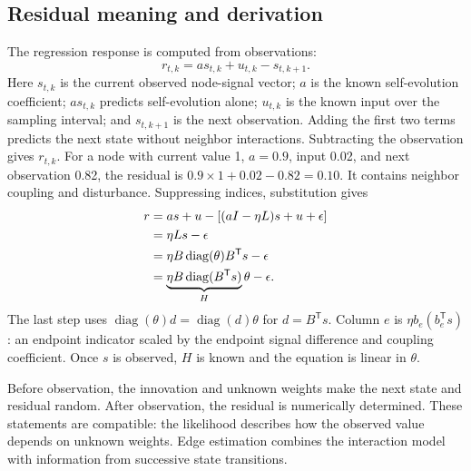 \documentclass[journal]{IEEEtran}
\newcommand{\T}{\mathsf T}
\begin{document}
\subsection{Residual meaning and derivation}
The regression response is computed from observations:
\begin{equation}
r_{t,k}=as_{t,k}+u_{t,k}-s_{t,k+1}.\label{eq:r}
\end{equation}
Here $s_{t,k}$ is the current observed node-signal vector; $a$ is the known self-evolution coefficient; $as_{t,k}$ predicts self-evolution alone; $u_{t,k}$ is the known input over the sampling interval; and $s_{t,k+1}$ is the next observation. Adding the first two terms predicts the next state without neighbor interactions. Subtracting the observation gives $r_{t,k}$. For a node with current value 1, $a=0.9$, input 0.02, and next observation 0.82, the residual is $0.9\times1+0.02-0.82=0.10$. It contains neighbor coupling and disturbance. Suppressing indices, substitution gives
\begin{align}
r&=as+u-[(aI-\eta L)s+u+\epsilon]\notag\\
 &=\eta Ls-\epsilon\notag\\
 &=\eta B\operatorname{diag}(\theta)B^\T s-\epsilon\notag\\
 &=\underbrace{\eta B\operatorname{diag}(B^\T s)}_{H}\theta-\epsilon.\label{eq:derive}
\end{align}
The last step uses $\operatorname{diag}(\theta)d=\operatorname{diag}(d)\theta$ for $d=B^\T s$. Column $e$ is $\eta b_e(b_e^\T s)$: an endpoint indicator scaled by the endpoint signal difference and coupling coefficient. Once $s$ is observed, $H$ is known and the equation is linear in $\theta$.

Before observation, the innovation and unknown weights make the next state and residual random. After observation, the residual is numerically determined. These statements are compatible: the likelihood describes how the observed value depends on unknown weights. Edge estimation combines the interaction model with information from successive state transitions.
\end{document}
